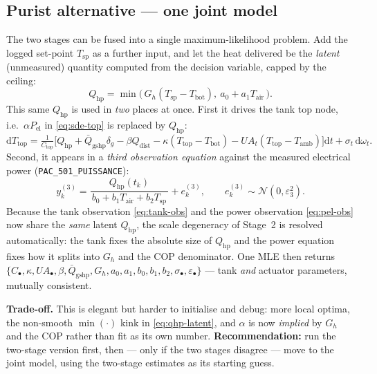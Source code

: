 \documentclass[11pt,a4paper]{article}
\newcommand{\Ttop}{T_{\mathrm{top}}}
\newcommand{\Tbot}{T_{\mathrm{bot}}}
\newcommand{\Tsp}{T_{\mathrm{sp}}} %
\newcommand{\Tair}{T_{\mathrm{air}}}
\newcommand{\Tamb}{T_{\mathrm{amb}}}
\newcommand{\Qhp}{Q_{\mathrm{hp}}}
\newcommand{\Pel}{P_{\mathrm{el}}}
\newcommand{\code}[1]{\texttt{#1}}
\begin{document}
\subsection{Purist alternative --- one joint model}
The two stages can be fused into a single maximum-likelihood problem. Add the
logged set-point $\Tsp$ as a further input, and let the heat delivered be the
\emph{latent} (unmeasured) quantity computed from the decision variable, capped by
the ceiling:
\begin{equation}
  \Qhp = \min\!\big(\,G_h(\Tsp-\Tbot),\ a_0+a_1\Tair\,\big).
  \label{eq:qhp-latent}
\end{equation}
This same $\Qhp$ is used in \emph{two} places at once. First it drives the tank top
node, i.e.\ $\alpha\Pel$ in \eqref{eq:sde-top} is replaced by $\Qhp$:
\begin{equation}
  \mathrm d\Ttop = \tfrac{1}{C_{\mathrm{top}}}\!\Big[
      \Qhp + \bar Q_{\mathrm{gshp}}\delta_g
      - \beta Q_{\mathrm{dist}} - \kappa(\Ttop-\Tbot) - UA_t(\Ttop-\Tamb)\Big]\mathrm dt
      + \sigma_t\,\mathrm d\omega_t .
  \label{eq:sde-top-joint}
\end{equation}
Second, it appears in a \emph{third observation equation} against the measured
electrical power (\code{PAC\_501\_PUISSANCE}):
\begin{equation}
  y^{(3)}_k = \frac{\Qhp(t_k)}{\,b_0+b_1\Tair+b_2\Tsp\,} + e^{(3)}_k,
  \qquad e^{(3)}_k\sim\mathcal N(0,\varepsilon_3^2).
  \label{eq:pel-obs}
\end{equation}
Because the tank observation \eqref{eq:tank-obs} and the power observation
\eqref{eq:pel-obs} now share the \emph{same} latent $\Qhp$, the scale degeneracy of
Stage~2 is resolved automatically: the tank fixes the absolute size of $\Qhp$ and
the power equation fixes how it splits into $G_h$ and the COP denominator. One MLE
then returns $\{C_\bullet,\kappa,UA_\bullet,\beta,\bar Q_{\mathrm{gshp}},G_h,a_0,a_1,
b_0,b_1,b_2,\sigma_\bullet,\varepsilon_\bullet\}$ --- tank \emph{and} actuator
parameters, mutually consistent.

\textbf{Trade-off.} This is elegant but harder to initialise and debug: more local
optima, the non-smooth $\min(\cdot)$ kink in \eqref{eq:qhp-latent}, and $\alpha$ is
now \emph{implied} by $G_h$ and the COP rather than fit as its own number.
\textbf{Recommendation:} run the two-stage version first, then --- only if the two
stages disagree --- move to the joint model, using the two-stage estimates as its
starting guess.
\end{document}
